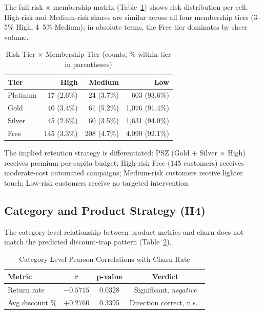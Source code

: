 \documentclass[conference]{IEEEtran}
\begin{document}
The full risk $\times$ membership matrix (Table~\ref{tab:budget_matrix}) shows risk distribution per cell. High-risk and Medium-risk shares are similar across all four membership tiers (3--5\% High, 4--5\% Medium); in absolute terms, the Free tier dominates by sheer volume.

\begin{table}[h]
\caption{Risk Tier $\times$ Membership Tier (counts; \% within tier in parentheses)}
\label{tab:budget_matrix}
\centering
\footnotesize
\renewcommand{\arraystretch}{1.2}
\begin{tabular}{l r r r}
\toprule
\textbf{Tier} & \textbf{High} & \textbf{Medium} & \textbf{Low} \\
\midrule
Platinum & 17 (2.6\%)  & 24 (3.7\%)   & 603 (93.6\%) \\
Gold     & 40 (3.4\%)  & 61 (5.2\%)   & 1{,}076 (91.4\%) \\
Silver   & 45 (2.6\%)  & 60 (3.5\%)   & 1{,}631 (94.0\%) \\
Free     & 145 (3.3\%) & 208 (4.7\%)  & 4{,}090 (92.1\%) \\
\bottomrule
\end{tabular}
\end{table}

The implied retention strategy is differentiated: PSZ (Gold + Silver $\times$ High) receives premium per-capita budget; High-risk Free (145 customers) receives moderate-cost automated campaigns; Medium-risk customers receive lighter touch; Low-risk customers receive no targeted intervention.

\subsection{Category and Product Strategy (H4)}

The category-level relationship between product metrics and churn does not match the predicted discount-trap pattern (Table~\ref{tab:h4}).

\begin{table}[h]
\caption{Category-Level Pearson Correlations with Churn Rate}
\label{tab:h4}
\centering
\renewcommand{\arraystretch}{1.2}
\begin{tabular}{l c c c}
\toprule
\textbf{Metric} & \textbf{r} & \textbf{p-value} & \textbf{Verdict} \\
\midrule
Return rate     & $-0.5715$ & 0.0328 & Significant, \emph{negative} \\
Avg discount \% & $+0.2760$ & 0.3395 & Direction correct, n.s.\ \\
\bottomrule
\end{tabular}
\end{table}
\end{document}
